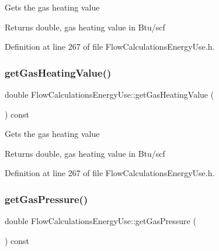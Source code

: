 Gets the gas heating value

\begin{DoxyReturn}{Returns}
double, gas heating value in Btu/scf 
\end{DoxyReturn}


Definition at line 267 of file Flow\+Calculations\+Energy\+Use.\+h.

\mbox{\label{class_flow_calculations_energy_use_a42818c3f03cc70967eb6bb24094530a1}} 
\subsubsection{\texorpdfstring{get\+Gas\+Heating\+Value()}{getGasHeatingValue()}\hspace{0.1cm}{\footnotesize\ttfamily [3/3]}}
{\footnotesize\ttfamily double Flow\+Calculations\+Energy\+Use\+::get\+Gas\+Heating\+Value (\begin{DoxyParamCaption}{ }\end{DoxyParamCaption}) const\hspace{0.3cm}{\ttfamily [inline]}}

Gets the gas heating value

\begin{DoxyReturn}{Returns}
double, gas heating value in Btu/scf 
\end{DoxyReturn}


Definition at line 267 of file Flow\+Calculations\+Energy\+Use.\+h.

\mbox{\label{class_flow_calculations_energy_use_af98e97bce88915e6fdd7a0caf837049c}} 
\subsubsection{\texorpdfstring{get\+Gas\+Pressure()}{getGasPressure()}\hspace{0.1cm}{\footnotesize\ttfamily [1/3]}}
{\footnotesize\ttfamily double Flow\+Calculations\+Energy\+Use\+::get\+Gas\+Pressure (\begin{DoxyParamCaption}{ }\end{DoxyParamCaption}) const\hspace{0.3cm}{\ttfamily [inline]}}

